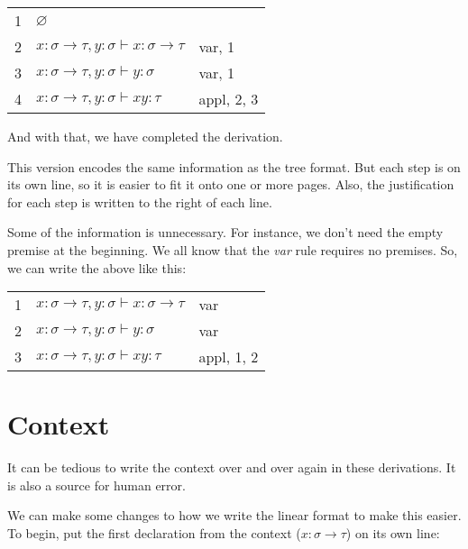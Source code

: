 \documentclass{book}
\numberwithin{equation}{chapter}
\newenvironment{typederivation}
  {\begin{tabular}[t]{l l l}}
  {\end{tabular}}
\newcommand{\tdnum}[1]{#1}
\newcommand{\tdjudge}[1]{& #1}
\newcommand{\tdjustify}[1]{& #1 \\}
\begin{document}
\begin{center}
\begin{typederivation}

  \tdnum{1} \tdjudge{$\varnothing$} \tdjustify{}
  \tdnum{2} \tdjudge{$x : \sigma \rightarrow \tau, y : \sigma \vdash x : \sigma \rightarrow \tau$} \tdjustify{var, 1}
  \tdnum{3} \tdjudge{$x : \sigma \rightarrow \tau, y : \sigma \vdash y : \sigma$} \tdjustify{var, 1}
  \tdnum{4} \tdjudge{$x : \sigma \rightarrow \tau, y : \sigma \vdash xy : \tau$} \tdjustify{appl, 2, 3}

\end{typederivation}
\end{center}

\noindent
And with that, we have completed the derivation.

This version encodes the same information as the tree format. But each step is on its own line, so it is easier to fit it onto one or more pages. Also, the justification for each step is written to the right of each line.

Some of the information is unnecessary. For instance, we don't need the empty premise at the beginning. We all know that the \textit{var} rule requires no premises. So, we can write the above like this:

\begin{center}
\begin{typederivation}

  \tdnum{1} \tdjudge{$x : \sigma \rightarrow \tau, y : \sigma \vdash x : \sigma \rightarrow \tau$} \tdjustify{var}
  \tdnum{2} \tdjudge{$x : \sigma \rightarrow \tau, y : \sigma \vdash y : \sigma$} \tdjustify{var}
  \tdnum{3} \tdjudge{$x : \sigma \rightarrow \tau, y : \sigma \vdash xy : \tau$} \tdjustify{appl, 1, 2}

\end{typederivation}
\end{center}


\section{Context}

It can be tedious to write the context over and over again in these derivations. It is also a source for human error. 

We can make some changes to how we write the linear format to make this easier. To begin, put the first declaration from the context ($x : \sigma \rightarrow \tau$) on its own line: 
\end{document}
